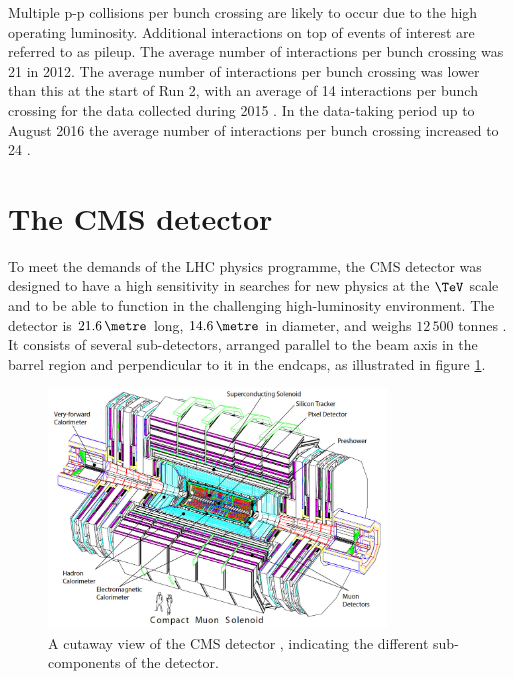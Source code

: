 Multiple p-p collisions per bunch crossing are likely to occur due to the high
operating luminosity. 
Additional interactions on top of events of 
interest are referred to as pileup. The average number of interactions %
per bunch crossing was 21 in 2012\cite{cms-lumi-public}. The average number of
interactions per bunch crossing was lower than this at the start of Run 2, with
an average of 14 interactions per bunch crossing for the data collected
during 2015 \cite{CMS-PAS-HIG-16-006}. In the data-taking period up to August 2016 the average number of interactions
per bunch crossing increased to 24 \cite{CMS-PAS-HIG-16-037}.

\section{The \acs{CMS} detector}
\label{sec:CMSLHC_CMS}
To meet the demands of the \ac{LHC} physics programme, the
 \ac{CMS} detector was designed to have a high sensitivity in searches 
for new physics at the $\TeV$ scale and to be able to 
function in the challenging high-luminosity environment.
The detector is $21.6\,\metre$ long, $14.6\,\metre$ in diameter, and weighs
$12\,500$ tonnes \cite{cms-jinst}. It consists of several sub-detectors, arranged parallel
to the beam axis in the barrel region and perpendicular to it in the endcaps, as illustrated
in figure \ref{fig:cms_detector}.
\begin{figure}[h!]
\includegraphics[width=0.8\textwidth]{./Detector/Plots/cms.png}
\caption[A cutaway view of the CMS detector, indicating the different sub-components of the detector.]{A cutaway view of the \ac{CMS} detector \cite{cms-jinst}, indicating the
different sub-components of the detector.}
\label{fig:cms_detector}
\end{figure}

